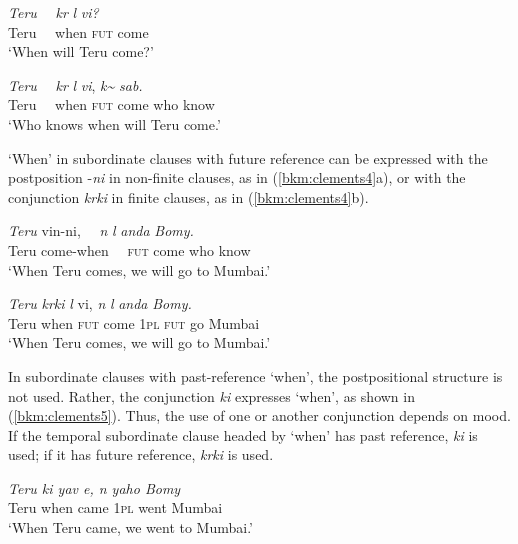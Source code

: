 \documentclass[output=paper,colorlinks,citecolor=brown]{langscibook}
\begin{document}
\ea{\label{bkm:clements3}}
\ea
    \gll \textit{Teru} \ \ \textit{k\textopeno r}  \textit{l\textschwa} \textit{vi?}\\
     Teru \ \ when \textsc{fut} come \\
    \glt `When will Teru come?'

    \ex
    \gll \textit{Teru} \ \ \textit{k\textopeno r}  \textit{l\textschwa} \textit{vi},  \textit{k\~\textepsilon} \textit{sab.}\\
    Teru \ \ when \textsc{fut} come who know\\
    \glt `Who knows when will Teru come.'
\z
\z


`When' in subordinate clauses with future reference can be expressed with the postposition -\textit{ni} in non-finite clauses, as in (\ref{bkm:clements4}a), or with the conjunction \textit{k\textopeno rki} in finite clauses, as in (\ref{bkm:clements4}b).

\ea{\label{bkm:clements4}}
\ea
\gll \textit{Teru}     {vin-ni},   \ \       \textit{n\textopeno}    \textit{{l\textschwa}}    \textit{anda}    \textit{Bom\textschwa y.}\\
 Teru    come-when    \ \ \textsc{fut}    come    who    know\\

\glt `When Teru comes, we will go to Mumbai.'

\ex
\gll \textit{Teru}     \textit{k\textopeno rki}     \textit{l\textschwa }    {vi},         \textit{n\textopeno}    \textit{{l\textschwa}}    \textit{anda}    \textit{Bom\textschwa y.}\\
Teru    when    \textsc{fut}    come        1\textsc{pl}    \textsc{fut}    go     Mumbai\\

\glt `When Teru comes, we will go to Mumbai.'

\z
\z

In subordinate clauses with past-reference `when', the postpositional structure is not used. Rather, the conjunction \textit{ki} expresses `when', as shown in (\ref{bkm:clements5}). Thus, the use of one or another conjunction depends on mood. If the temporal subordinate clause headed by `when' has past reference, \textit{ki} is used; if it has future reference, \textit{k\textopeno rki} is used.

\ea{\label{bkm:clements5}}

\gll \textit{Teru     ki     yav e,        n\textopeno{}     yaho    Bom\textschwa y} \\
Teru    when    came        1\textsc{pl}   went    Mumbai\\
\glt `When Teru came, we went to Mumbai.'
\z
\end{document}
